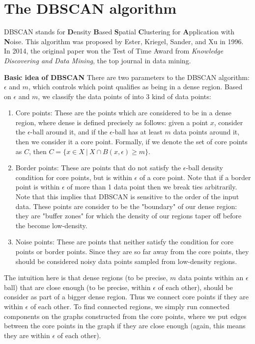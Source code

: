 \section{The DBSCAN algorithm}
  DBSCAN stands for \textbf{D}ensity \textbf{B}ased \textbf{S}patial
  \textbf{C}lustering  for \textbf{A}pplication with \textbf{N}oise. This
  algorithm was proposed by Ester, Kriegel, Sander, and Xu in 1996. In 2014,
  the original paper won the Test of Time Award from \textit{Knowledge Discovering and Data Mining},
  the top journal in data mining.
  
  \noindent\textbf{Basic idea of DBSCAN}  
  There are two parameters to the DBSCAN algorithm: $\epsilon$ and $m$, which
  controls which point qualifies as being in a dense region. Based on $\epsilon$
  and $m$, we classify the data points of into 3 kind of data points:

  \begin{enumerate}
  \item Core points: These are the points which are considered to be in a
  dense region, where dense is defined precisely as follows: given a point $x$,
  consider the $\epsilon$-ball around it, and if the $\epsilon$-ball has
  at least $m$ data points around it, then we consider it a core point. Formally,
  if we denote the set of core points as $C$, then $C=\{x \in X \ | \ X \cap B(x,\epsilon)\geq m\}$.
  \item Border points: These are points that do not satisfy the $\epsilon$-ball
  density condition for core points, but is within $\epsilon$ of a core point.
  Note that if a border point is within $\epsilon$ of more than 1 data point
  then we break ties arbitrarily. Note that this implies that DBSCAN is sensitive
  to the order of the input data. These points are consider to be the "boundary"
  of our dense region: they are "buffer zones" for which the density of our regions
  taper off before the become low-density.
  \item Noise points: These are points that neither satisfy the condition for
  core points or border points. Since they are so far away from the core points,
  they should be considered noisy data points sampled from low-density regions.
  \end{enumerate}

  The intuition here is that dense regions (to be precise, $m$ data points within
  an $\epsilon$ ball) that are close enough (to be precise, within $\epsilon$ of each other),
  should be consider as part of a bigger dense region. Thus we connect core
  points if they are within $\epsilon$ of each other. To find connected regions,
  we simply run connected components on the graphs constructed from the core
  points, where we put edges between the core points in the graph if they are
  close enough (again, this means they are within $\epsilon$ of each other).

